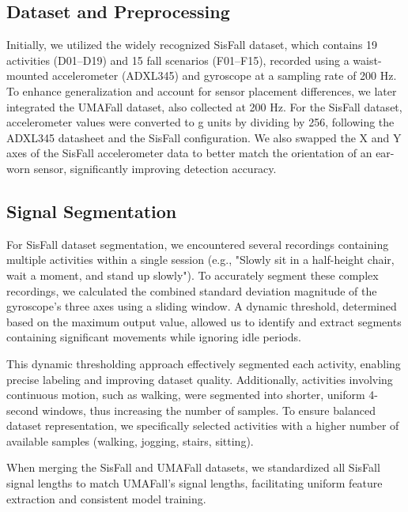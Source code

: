 \documentclass[conference]{IEEEtran}
\begin{document}
\subsection{Dataset and Preprocessing}

Initially, we utilized the widely recognized SisFall dataset, which contains 19 activities (D01–D19) and 15 fall scenarios (F01–F15), recorded using a waist-mounted accelerometer (ADXL345) and gyroscope at a sampling rate of 200 Hz. To enhance generalization and account for sensor placement differences, we later integrated the UMAFall dataset, also collected at 200 Hz. For the SisFall dataset, accelerometer values were converted to g units by dividing by 256, following the ADXL345 datasheet and the SisFall configuration. We also swapped the X and Y axes of the SisFall accelerometer data to better match the orientation of an ear-worn sensor, significantly improving detection accuracy.

\subsection{Signal Segmentation}

For SisFall dataset segmentation, we encountered several recordings containing multiple activities within a single session (e.g., "Slowly sit in a half-height chair, wait a moment, and stand up slowly"). To accurately segment these complex recordings, we calculated the combined standard deviation magnitude of the gyroscope's three axes using a sliding window. A dynamic threshold, determined based on the maximum output value, allowed us to identify and extract segments containing significant movements while ignoring idle periods.
\vspace{1em}

This dynamic thresholding approach effectively segmented each activity, enabling precise labeling and improving dataset quality. Additionally, activities involving continuous motion, such as walking, were segmented into shorter, uniform 4-second windows, thus increasing the number of samples. To ensure balanced dataset representation, we specifically selected activities with a higher number of available samples (walking, jogging, stairs, sitting).
\vspace{1em}

When merging the SisFall and UMAFall datasets, we standardized all SisFall signal lengths to match UMAFall's signal lengths, facilitating uniform feature extraction and consistent model training.
\vspace{1em}
\end{document}
